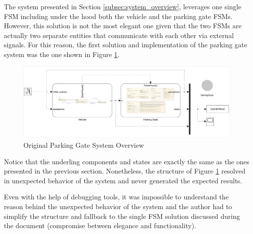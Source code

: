 \documentclass{assignment}
\begin{document}
The system presented in Section \ref{subsec:system_overview}, leverages one single FSM including under the hood both the vehicle and the parking gate FSMs.
However, this solution is not the most elegant one given that the two FSMs are actually two separate entities that communicate with each other via external signals.
For this reason, the first solution and implementation of the parking gate system was the one shown in Figure \ref{fig:original_parking_gate_system_overview}.

\begin{figure}[H]
    \centering
    \includegraphics[width=1.0\textwidth]{./img/MATLAB/original_version.pdf}
    \caption{Original Parking Gate System Overview}
    \label{fig:original_parking_gate_system_overview}
\end{figure}

Notice that the underling components and states are exactly the same as the ones presented in the previous section.
Nonetheless, the structure of Figure \ref{fig:original_parking_gate_system_overview} resolved in unexpected behavior of the system and never generated the expected results.

Even with the help of debugging tools, it was impossible to understand the reason behind the unexpected behavior of the system and the author had to simplify the structure and fallback to the single FSM solution discussed during the document (compromise between elegance and functionality).
\end{document}
